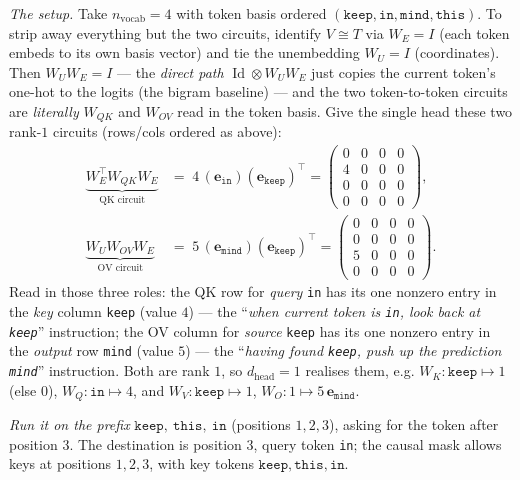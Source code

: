 \begin{callout}
\emph{The setup.} Take $n_{\text{vocab}}=4$ with token basis ordered $(\texttt{keep},\texttt{in},\texttt{mind},\texttt{this})$. To strip away everything but the two circuits, identify $V\cong T$ via $W_E = I$ (each token embeds to its own basis vector) and tie the unembedding $W_U = I$ (coordinates). Then $W_UW_E=I$ --- the \emph{direct path} $\operatorname{Id}\otimes W_UW_E$ just copies the current token's one-hot to the logits (the bigram baseline) --- and the two token-to-token circuits are \emph{literally} $W_{QK}$ and $W_{OV}$ read in the token basis. Give the single head these two rank-$1$ circuits (rows/cols ordered as above):
\[
\begin{aligned}
\underbrace{W_E^{\top}W_{QK}W_E}_{\text{QK circuit}}
&=\;4\,(\mathbf e_{\texttt{in}})(\mathbf e_{\texttt{keep}})^{\top}
=\begin{pmatrix}0&0&0&0\\ 4&0&0&0\\ 0&0&0&0\\ 0&0&0&0\end{pmatrix},\\[4pt]
\underbrace{W_UW_{OV}W_E}_{\text{OV circuit}}
&=\;5\,(\mathbf e_{\texttt{mind}})(\mathbf e_{\texttt{keep}})^{\top}
=\begin{pmatrix}0&0&0&0\\ 0&0&0&0\\ 5&0&0&0\\ 0&0&0&0\end{pmatrix}.
\end{aligned}
\]
Read in those three roles: the QK row for \emph{query} \texttt{in} has its one nonzero entry in the \emph{key} column \texttt{keep} (value $4$) --- the ``\emph{when current token is \texttt{in}, look back at \texttt{keep}}'' instruction; the OV column for \emph{source} \texttt{keep} has its one nonzero entry in the \emph{output} row \texttt{mind} (value $5$) --- the ``\emph{having found \texttt{keep}, push up the prediction \texttt{mind}}'' instruction. Both are rank $1$, so $d_{\text{head}}=1$ realises them, e.g. $W_K:\texttt{keep}\mapsto 1$ (else $0$), $W_Q:\texttt{in}\mapsto 4$, and $W_V:\texttt{keep}\mapsto 1$, $W_O:1\mapsto 5\,\mathbf e_{\texttt{mind}}$.

\emph{Run it on the prefix} $\texttt{keep},\ \texttt{this},\ \texttt{in}$ (positions $1,2,3$), asking for the token after position $3$. The destination is position $3$, query token \texttt{in}; the causal mask allows keys at positions $1,2,3$, with key tokens $\texttt{keep},\texttt{this},\texttt{in}$.


\end{callout}
